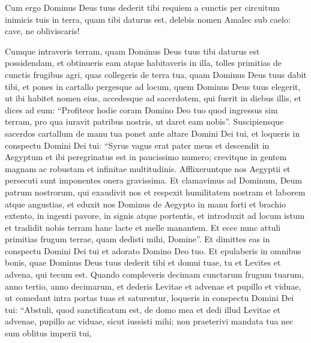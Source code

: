 \begin{biblechapter}
\begin{biblechapter}
\begin{biblechapter}
\begin{biblechapter}
\begin{biblechapter}
\begin{biblechapter}
\begin{biblechapter}
\begin{biblechapter}
\begin{biblechapter}
\begin{biblechapter}
\begin{biblechapter}
\begin{biblechapter}
\begin{biblechapter}
\begin{biblechapter}
\begin{biblechapter}
\begin{biblechapter}
\begin{biblechapter}
\begin{biblechapter}
\begin{biblechapter}
\begin{biblechapter}
\begin{biblechapter}
\begin{biblechapter}
\begin{biblechapter}
\begin{biblechapter}
\begin{biblechapter}
\verse Cum ergo Dominus Deus tuus dederit tibi requiem a cunctis per circuitum inimicis tuis in terra, quam tibi daturus est, delebis nomen Amalec sub caelo: cave, ne obliviscaris!
 
\begin{biblechapter}
\verse Cumque intraveris terram, quam Dominus Deus tuus tibi daturus est possidendam, et obtinueris eam atque habitaveris in illa, 
\verse tolles primitias de cunctis frugibus agri, quas collegeris de terra tua, quam Dominus Deus tuus dabit tibi, et pones in cartallo pergesque ad locum, quem Dominus Deus tuus elegerit, ut ibi habitet nomen eius, 
\verse accedesque ad sacerdotem, qui fuerit in diebus illis, et dices ad eum: “Profiteor hodie coram Domino Deo tuo quod ingressus sim terram, pro qua iuravit patribus nostris, ut daret eam nobis”. 
\verse Suscipiensque sacerdos cartallum de manu tua ponet ante altare Domini Dei tui, 
 \verse et loqueris in conspectu Domini Dei tui: “Syrus vagus erat pater meus et descendit in Aegyptum et ibi peregrinatus est in paucissimo numero; crevitque in gentem magnam ac robustam et infinitae multitudinis. 
\verse Afflixeruntque nos Aegyptii et persecuti sunt imponentes onera gravissima. 
\verse Et clamavimus ad Dominum, Deum patrum nostrorum, qui exaudivit nos et respexit humilitatem nostram et laborem atque angustias, 
\verse et eduxit nos Dominus de Aegypto in manu forti et brachio extento, in ingenti pavore, in signis atque portentis, 
 \verse et introduxit ad locum istum et tradidit nobis terram hanc lacte et melle manantem. 
\verse Et ecce nunc attuli primitias frugum terrae, quam dedisti mihi, Domine”. Et dimittes eas in conspectu Domini Dei tui et adorato Domino Deo tuo. 
\verse Et epulaberis in omnibus bonis, quae Dominus Deus tuus dederit tibi et domui tuae, tu et Levites et advena, qui tecum est.
 \verse Quando compleveris decimam cunctarum frugum tuarum, anno tertio, anno decimarum, et dederis Levitae et advenae et pupillo et viduae, ut comedant intra portas tuas et saturentur, 
\verse loqueris in conspectu Domini Dei tui: “Abstuli, quod sanctificatum est, de domo mea et dedi illud Levitae et advenae, pupillo ac viduae, sicut iussisti mihi; non praeterivi mandata tua nec sum oblitus imperii tui, 

\end{biblechapter}
\end{biblechapter}
\end{biblechapter}
\end{biblechapter}
\end{biblechapter}
\end{biblechapter}
\end{biblechapter}
\end{biblechapter}
\end{biblechapter}
\end{biblechapter}
\end{biblechapter}
\end{biblechapter}
\end{biblechapter}
\end{biblechapter}
\end{biblechapter}
\end{biblechapter}
\end{biblechapter}
\end{biblechapter}
\end{biblechapter}
\end{biblechapter}
\end{biblechapter}
\end{biblechapter}
\end{biblechapter}
\end{biblechapter}
\end{biblechapter}
\end{biblechapter}

